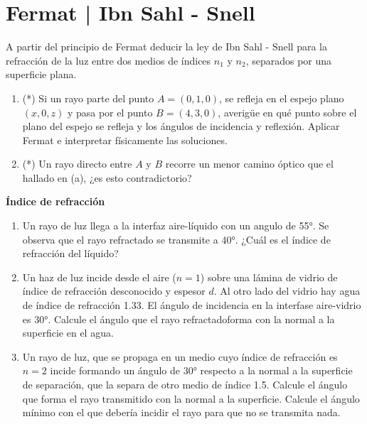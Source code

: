 \section*{Fermat | Ibn Sahl - Snell}

\item
A partir del principio de Fermat deducir la ley de Ibn Sahl - Snell para la refracción de la luz entre dos medios de índices $n_1$ y $n_2$, separados por una superficie plana.


\item
\begin{enumerate}
	\item (*) Si un rayo parte del punto $A=(0,1,0)$, se refleja en el espejo plano $(x,0,z)$ y pasa por el punto $B=(4,3,0)$, averigüe en qué punto sobre el plano del espejo se refleja y los ángulos de incidencia y reflexión.
	Aplicar Fermat e interpretar físicamente las soluciones. 
	\item (*) Un rayo directo entre $A$ y $B$ recorre un menor camino óptico que el hallado en (a), ¿es esto contradictorio?
\end{enumerate}


\item \textbf{Índice de refracción}
\begin{enumerate}
	\item Un rayo de luz llega a la interfaz aire-líquido con un angulo de \ang{55}.
	Se observa que el rayo refractado se transmite a \ang{40}.
	¿Cuál es el índice de refracción del líquido?
	\item Un haz de luz incide desde el aire (\(n= 1\)) sobre una lámina de vidrio de índice de refracción desconocido y espesor \(d\).
	Al otro lado del vidrio hay agua de índice de refracción \num{1.33}.
	El ángulo de incidencia en la interfase aire-vidrio es \ang{30}.
	Calcule el ángulo que el rayo refractadoforma con la normal a la superficie en el agua.
	\item Un rayo de luz, que se propaga en un medio cuyo índice de refracción es \(n= 2\) incide formando un ángulo de \ang{30} respecto a la normal a la superficie de separación, que la separa de otro medio de índice \num{1.5}.
	Calcule el ángulo que forma el rayo transmitido con la normal a la superficie.
	Calcule el ángulo mínimo con el que debería incidir el rayo para que no se transmita nada.
\end{enumerate}



